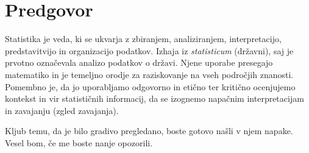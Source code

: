\section{Predgovor}

Statistika je veda, ki se ukvarja z zbiranjem, analiziranjem, interpretacijo, predstavitvijo in organizacijo podatkov. Izhaja iz \textit{statisticum} (državni), saj je prvotno označevala analizo podatkov o državi. Njene uporabe presegajo matematiko in je temeljno orodje za raziskovanje na vseh področjih znanosti. Pomembno je, da jo uporabljamo odgovorno in etično ter kritično ocenjujemo kontekst in vir statističnih informacij, da se izognemo napačnim interpretacijam in zavajanju (zgled zavajanja).

Kljub temu, da je bilo gradivo pregledano, boste gotovo našli v njem napake. Vesel bom, če me boste nanje opozorili.